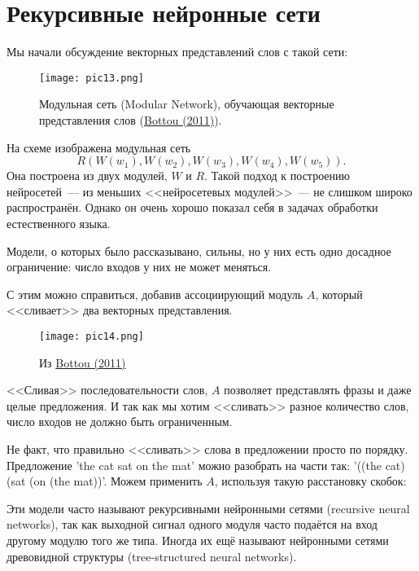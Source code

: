 \documentclass[a4paper,12pt]{article}
\begin{document}
\section*{Рекурсивные нейронные сети}

Мы начали обсуждение векторных представлений слов с такой сети:

\begin{figure}[t]
\begin{center}
\texttt{[image: pic13.png]}
\caption{Модульная сеть (Modular Network), обучающая векторные представления слов (\href{http://arxiv.org/pdf/1102.1808v3.pdf}{Bottou (2011)}).}
\end{center}
\end{figure}

На схеме изображена модульная сеть $$R(W(w_1), W(w_2), W(w_3), W(w_4), W(w_5)).$$ Она построена из двух модулей, $W$ и $R$. Такой подход к построению нейросетей~--- из меньших <<нейросетевых модулей>>~--- не слишком широко распространён. Однако он очень хорошо показал себя в задачах обработки естественного языка.


Модели, о которых было рассказывано, сильны, но у них есть одно досадное ограничение: число входов у них не может меняться.

С этим можно справиться, добавив ассоциирующий модуль $A$, который  <<сливает>> два векторных представления.


\begin{figure}[t]
\begin{center}
\texttt{[image: pic14.png]}
\caption{Из \href{http://arxiv.org/pdf/1102.1808v3.pdf}{Bottou (2011)}}
\end{center}
\end{figure}

<<Сливая>> последовательности слов, $A$ позволяет представлять фразы и даже целые предложения. И так как мы хотим <<сливать>> разное количество слов, число входов не должно быть ограниченным.

Не факт, что правильно <<сливать>> слова в предложении просто по порядку. Предложение 'the cat sat on the mat' можно разобрать на части так: '((the cat) (sat (on (the mat))'. Можем применить $A$, используя такую расстановку скобок:

Эти модели часто называют рекурсивными нейронными сетями (recursive neural networks), так как выходной сигнал одного модуля часто подаётся на вход другому модулю того же типа. Иногда их ещё называют нейронными сетями древовидной структуры (tree-structured neural networks).
\end{document}
